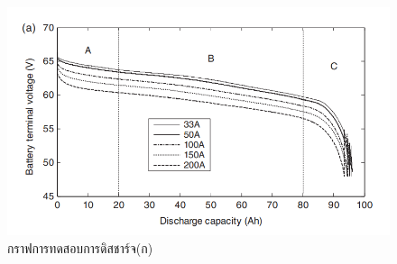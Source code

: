 \begin{center}
	\begin{figure}[H]
		\includegraphics[width=0.6\linewidth]{Chapters/img/IV_a.png}
			\centering
			\captionsetup{justification=centering,margin=2cm}
			\caption{กราฟการทดสอบการดิสชาร์จ(ก)}
	\end{figure}
\end{center}
